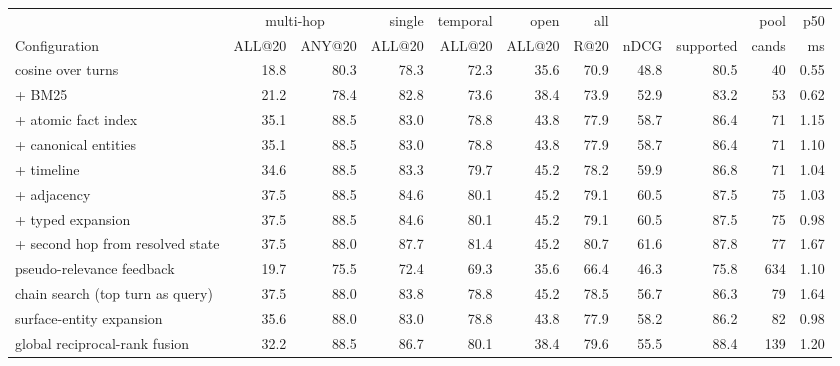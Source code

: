 \begin{tabular}{lrrrrrrrrrr}
\toprule
 & \multicolumn{2}{c}{multi-hop} & single & temporal & open & all & & & pool & p50 \\
\cmidrule(lr){2-3}
Configuration & ALL@20 & ANY@20 & ALL@20 & ALL@20 & ALL@20 & R@20 & nDCG & supported & cands & ms \\
\midrule
cosine over turns & 18.8 & 80.3 & 78.3 & 72.3 & 35.6 & 70.9 & 48.8 & 80.5 & 40 & 0.55 \\
+ BM25 & 21.2 & 78.4 & 82.8 & 73.6 & 38.4 & 73.9 & 52.9 & 83.2 & 53 & 0.62 \\
+ atomic fact index & 35.1 & 88.5 & 83.0 & 78.8 & 43.8 & 77.9 & 58.7 & 86.4 & 71 & 1.15 \\
+ canonical entities & 35.1 & 88.5 & 83.0 & 78.8 & 43.8 & 77.9 & 58.7 & 86.4 & 71 & 1.10 \\
+ timeline & 34.6 & 88.5 & 83.3 & 79.7 & 45.2 & 78.2 & 59.9 & 86.8 & 71 & 1.04 \\
+ adjacency & 37.5 & 88.5 & 84.6 & 80.1 & 45.2 & 79.1 & 60.5 & 87.5 & 75 & 1.03 \\
+ typed expansion & 37.5 & 88.5 & 84.6 & 80.1 & 45.2 & 79.1 & 60.5 & 87.5 & 75 & 0.98 \\
+ second hop from resolved state & 37.5 & 88.0 & 87.7 & 81.4 & 45.2 & 80.7 & 61.6 & 87.8 & 77 & 1.67 \\
\midrule
pseudo-relevance feedback & 19.7 & 75.5 & 72.4 & 69.3 & 35.6 & 66.4 & 46.3 & 75.8 & 634 & 1.10 \\
chain search (top turn as query) & 37.5 & 88.0 & 83.8 & 78.8 & 45.2 & 78.5 & 56.7 & 86.3 & 79 & 1.64 \\
surface-entity expansion & 35.6 & 88.0 & 83.0 & 78.8 & 43.8 & 77.9 & 58.2 & 86.2 & 82 & 0.98 \\
global reciprocal-rank fusion & 32.2 & 88.5 & 86.7 & 80.1 & 38.4 & 79.6 & 55.5 & 88.4 & 139 & 1.20 \\
\bottomrule
\end{tabular}
